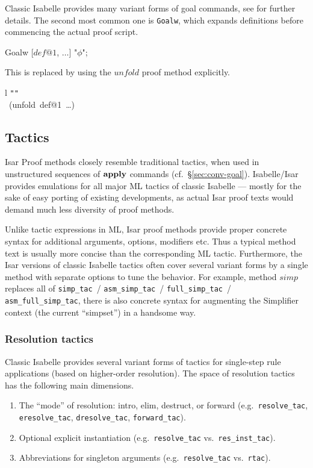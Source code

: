 \medskip Classic Isabelle provides many variant forms of goal commands, see
\cite{isabelle-ref} for further details.  The second most common one is
\texttt{Goalw}, which expands definitions before commencing the actual proof
script.
\begin{ttbox}
 Goalw [\(def@1\), \(\dots\)] "\(\phi\)";
\end{ttbox}
This is replaced by using the $unfold$ proof method explicitly.
\begin{matharray}{l}
\texttt"{\phi}\texttt" \\
\quad {}~(unfold~def@1~\dots) \\
\end{matharray}



\subsection{Tactics}\label{sec:conv-tac}

Isar Proof methods closely resemble traditional tactics, when used in
unstructured sequences of ${\mathord{\mathbf{apply}}}$ commands (cf.\ 
\S\ref{sec:conv-goal}).  Isabelle/Isar provides emulations for all major ML
tactics of classic Isabelle --- mostly for the sake of easy porting of
existing developments, as actual Isar proof texts would demand much less
diversity of proof methods.

Unlike tactic expressions in ML, Isar proof methods provide proper concrete
syntax for additional arguments, options, modifiers etc.  Thus a typical
method text is usually more concise than the corresponding ML tactic.
Furthermore, the Isar versions of classic Isabelle tactics often cover several
variant forms by a single method with separate options to tune the behavior.
For example, method $simp$ replaces all of \texttt{simp_tac}~/
\texttt{asm_simp_tac}~/ \texttt{full_simp_tac}~/ \texttt{asm_full_simp_tac},
there is also concrete syntax for augmenting the Simplifier context (the
current ``simpset'') in a handsome way.


\subsubsection{Resolution tactics}

Classic Isabelle provides several variant forms of tactics for single-step
rule applications (based on higher-order resolution).  The space of resolution
tactics has the following main dimensions.
\begin{enumerate}
\item The ``mode'' of resolution: intro, elim, destruct, or forward (e.g.\ 
  \texttt{resolve_tac}, \texttt{eresolve_tac}, \texttt{dresolve_tac},
  \texttt{forward_tac}).
\item Optional explicit instantiation (e.g.\ \texttt{resolve_tac} vs.\ 
  \texttt{res_inst_tac}).
\item Abbreviations for singleton arguments (e.g.\ \texttt{resolve_tac} vs.\ 
  \texttt{rtac}).
\end{enumerate}

